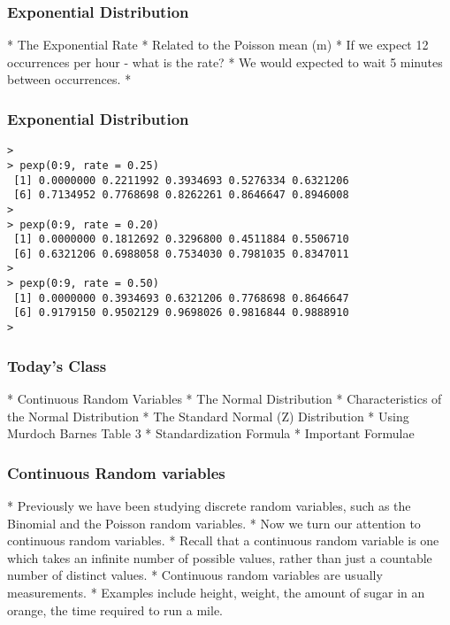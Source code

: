 \begin{frame}[fragile]
\frametitle{Exponential Distribution}
\begin{itemize}
*  The Exponential Rate 
*  Related to the Poisson mean (m)
*  If we expect 12 occurrences per hour - what is the rate?
*  We would expected to wait 5 minutes between occurrences.
*  
\end{itemize}
\end{frame}
\begin{frame}[fragile]
\frametitle{Exponential Distribution}
\begin{verbatim}
>
> pexp(0:9, rate = 0.25)
 [1] 0.0000000 0.2211992 0.3934693 0.5276334 0.6321206
 [6] 0.7134952 0.7768698 0.8262261 0.8646647 0.8946008
>
> pexp(0:9, rate = 0.20)
 [1] 0.0000000 0.1812692 0.3296800 0.4511884 0.5506710
 [6] 0.6321206 0.6988058 0.7534030 0.7981035 0.8347011
>
> pexp(0:9, rate = 0.50)
 [1] 0.0000000 0.3934693 0.6321206 0.7768698 0.8646647
 [6] 0.9179150 0.9502129 0.9698026 0.9816844 0.9888910
> 
\end{verbatim}
\end{frame}
\begin{frame}
\frametitle{ Today's Class }
\begin{itemize}
*  Continuous Random Variables
*  The Normal Distribution
*  Characteristics of the Normal Distribution
*  The Standard Normal (Z) Distribution
*  Using Murdoch Barnes Table 3
*  Standardization Formula
*  Important Formulae
\end{itemize}
\end{frame}
\begin{frame}
\frametitle{Continuous Random variables}
\begin{itemize}
*  Previously we have been studying discrete random variables, such as the Binomial and the Poisson random variables.
*  Now we turn our attention to continuous random variables.
*  Recall that a continuous random variable is one which takes an infinite number of possible values, rather than just a countable number of distinct values.
*  Continuous random variables are usually measurements.
*  Examples include height, weight, the amount of sugar in an orange, the time required to run a mile.
\end{itemize}

\end{frame}
